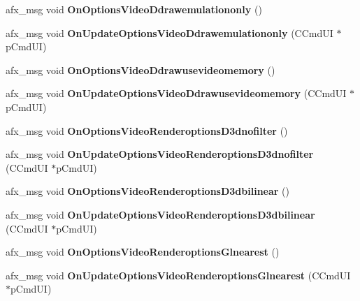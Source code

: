 \begin{DoxyCompactItemize}
afx\+\_\+msg void {\bfseries On\+Options\+Video\+Ddrawemulationonly} ()
\item 
\mbox{\label{class_main_wnd_a970b6c15909603ac56471c2275170791}} 
afx\+\_\+msg void {\bfseries On\+Update\+Options\+Video\+Ddrawemulationonly} (C\+Cmd\+UI $\ast$p\+Cmd\+UI)
\item 
\mbox{\label{class_main_wnd_a1ba5ef62512a0cdef95369a411bb3c0d}} 
afx\+\_\+msg void {\bfseries On\+Options\+Video\+Ddrawusevideomemory} ()
\item 
\mbox{\label{class_main_wnd_a142e1ed6bc371e50341d8e60ce1afa82}} 
afx\+\_\+msg void {\bfseries On\+Update\+Options\+Video\+Ddrawusevideomemory} (C\+Cmd\+UI $\ast$p\+Cmd\+UI)
\item 
\mbox{\label{class_main_wnd_add9253b241396c29c979ef81199b7fb3}} 
afx\+\_\+msg void {\bfseries On\+Options\+Video\+Renderoptions\+D3dnofilter} ()
\item 
\mbox{\label{class_main_wnd_a09f3b77c773efa5548d4edbc23e2f1cb}} 
afx\+\_\+msg void {\bfseries On\+Update\+Options\+Video\+Renderoptions\+D3dnofilter} (C\+Cmd\+UI $\ast$p\+Cmd\+UI)
\item 
\mbox{\label{class_main_wnd_abc93855509cbfc4d8c063d7be9d765d4}} 
afx\+\_\+msg void {\bfseries On\+Options\+Video\+Renderoptions\+D3dbilinear} ()
\item 
\mbox{\label{class_main_wnd_a0e30aec4baedb265a010ea7a65c1cecb}} 
afx\+\_\+msg void {\bfseries On\+Update\+Options\+Video\+Renderoptions\+D3dbilinear} (C\+Cmd\+UI $\ast$p\+Cmd\+UI)
\item 
\mbox{\label{class_main_wnd_a02eb06936ef0d4723a0bf743db3d929b}} 
afx\+\_\+msg void {\bfseries On\+Options\+Video\+Renderoptions\+Glnearest} ()
\item 
\mbox{\label{class_main_wnd_a919aee70c540401f59a34852550fe698}} 
afx\+\_\+msg void {\bfseries On\+Update\+Options\+Video\+Renderoptions\+Glnearest} (C\+Cmd\+UI $\ast$p\+Cmd\+UI)
\item 
\mbox{\label{class_main_wnd_afff6d21ce58320731fae2b0f38390640}} 

\end{DoxyCompactItemize}
